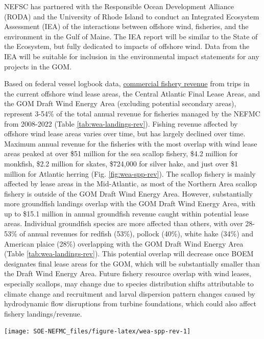 \documentclass[
  10pt,
]{article}
\let\origfigure\figure
\let\endorigfigure\endfigure
\renewenvironment{figure}[1][2] {
    \expandafter\origfigure\expandafter[H]
} {
    \endorigfigure
}
\begin{document}
NEFSC has partnered with the Responsible Ocean Development Alliance (RODA) and the University of Rhode Island to conduct an Integrated Ecosystem Assessment (IEA) of the interactions between offshore wind, fisheries, and the environment in the Gulf of Maine. The IEA report will be similar to the State of the Ecosystem, but fully dedicated to impacts of offshore wind. Data from the IEA will be suitable for inclusion in the environmental impact statements for any projects in the GOM.

Based on federal vessel logbook data, \href{https://noaa-edab.github.io/catalog/fishery-impacts-from-offshore-wind-development.html}{commercial fishery revenue} from trips in the current offshore wind lease areas, the Central Atlantic Final Lease Areas, and the GOM Draft Wind Energy Area (excluding potential secondary areas), represent 3-54\% of the total annual revenue for fisheries managed by the NEFMC from 2008-2022 (Table \ref{tab:wea-landings-rev}). Fishing revenue affected by offshore wind lease areas varies over time, but has largely declined over time. Maximum annual revenue for the fisheries with the most overlap with wind lease areas peaked at over \$51 million for the sea scallop fishery, \$4.2 million for monkfish, \$2.2 million for skates, \$724,000 for silver hake, and just over \$1 million for Atlantic herring (Fig. \ref{fig:wea-spp-rev}). The scallop fishery is mainly affected by lease areas in the Mid-Atlantic, as most of the Northern Area scallop fishery is outside of the GOM Draft Wind Energy Area. However, substantially more groundfish landings overlap with the GOM Draft Wind Energy Area, with up to \$15.1 million in annual groundfish revenue caught within potential lease areas. Individual groundfish species are more affected than others, with over 28-53\% of annual revenues for redfish (53\%), pollock (40\%), white hake (34\%) and American plaice (28\%) overlapping with the GOM Draft Wind Energy Area (Table \ref{tab:wea-landings-rev}). This potential overlap will decrease once BOEM designates final lease areas for the GOM, which will be substantially smaller than the Draft Wind Energy Area. Future fishery resource overlap with wind leases, especially scallops, may change due to species distribution shifts attributable to climate change and recruitment and larval dispersion pattern changes caused by hydrodynamic flow disruptions from turbine foundations, which could also affect fishery landings/revenue.

\begin{figure}

{\centering \texttt{[image: SOE-NEFMC\_files/figure-latex/wea-spp-rev-1]} 

}

\caption{Fishery revenues from NEFMC managed species in the Wind energy lease areas.}\label{fig:wea-spp-rev}
\end{figure}
\providecommand{\docline}[3]{\noalign{\global\setlength{\arrayrulewidth}{#1}}\arrayrulecolor[HTML]{#2}\cline{#3}}
\end{document}
